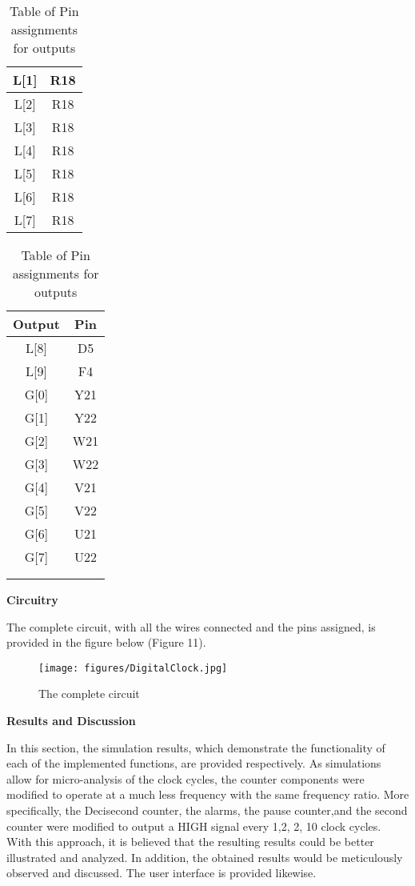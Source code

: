 \documentclass[12pt,a4paper]{article}
\begin{document}
\begin{table}[H]
\begin{tabular}{|c | c| }
		L[1]&R18\\\hline
		L[2]&R18\\\hline
		L[3]&R18\\\hline
		L[4]&R18\\\hline
		L[5]&R18\\\hline
		L[6]&R18\\\hline
		L[7]&R18\\\hline
	\end{tabular}
	\hspace{0.2cm}
	\begin{tabular}{|c | c| }
		\hline
		\textbf{Output} & \textbf{Pin}  \\ \hline
		L[8]&D5\\\hline
		L[9]&F4\\\hline
		G[0]&Y21\\\hline
		G[1]&Y22\\\hline
		G[2]&W21\\\hline
		G[3]&W22\\\hline
		G[4]&V21\\\hline
		G[5]&V22\\\hline
		G[6]&U21\\\hline
		G[7]&U22\\\hline
		&\\\hline
		&\\\hline
	\end{tabular}
	\caption{Table of Pin assignments for outputs}
\end{table}
	
	\vspace{2cm}
	\noindent \textbf{\large Circuitry}
	\vspace{0.2cm}
	
	\noindent The complete circuit, with all the wires connected and the pins assigned, is provided in the figure below (Figure 11).
	
	\begin{figure}[H]
		\centering
		\texttt{[image: figures/DigitalClock.jpg]}
		\caption{The complete circuit}
	\end{figure}

	\vspace{2cm}
	\noindent \textbf{\Large Results and Discussion}
	\vspace{0.2cm}
	
	\noindent In this section, the simulation results, which demonstrate the functionality of each of the implemented functions, are provided respectively. As simulations allow for micro-analysis of the clock cycles, the counter components were modified to operate at a much less frequency with the same frequency ratio. More specifically, the Decisecond counter, the alarms, the pause counter,and the second counter were modified to output a HIGH signal every 1,2, 2, 10 clock cycles. With this approach, it is believed that the resulting results could be better illustrated and analyzed. In addition, the obtained results would be meticulously observed and discussed. The user interface is provided likewise. 
	
\end{document}

